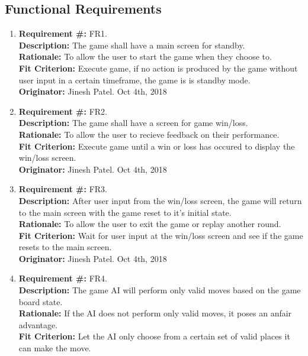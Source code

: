 \documentclass[12pt, titlepage]{article}
\renewcommand{\bf}{\textbf}
\begin{document}
\subsection{Functional Requirements}

\begin{enumerate}
	\item \bf{Requirement \#:} FR1.\\
	      \bf{Description:} The game shall have a main screen for standby.\\
	      \bf{Rationale:} To allow the user to start the game when they choose to.\\
	      \bf{Fit Criterion:} Execute game, if no action is produced by the game without user input in a certain timeframe, the game is is standby mode.\\
	      \bf{Originator:} Jinesh Patel. Oct 4th, 2018
	\item \bf{Requirement \#:} FR2.\\
	      \bf{Description:} The game shall have a screen for game win/loss.\\
	      \bf{Rationale:} To allow the user to recieve feedback on their performance.\\
	      \bf{Fit Criterion:} Execute game until a win or loss has occured to display the win/loss screen.\\
	      \bf{Originator:} Jinesh Patel. Oct 4th, 2018
	\item \bf{Requirement \#:} FR3.\\
	      \bf{Description:} After user input from the win/loss screen, the game will return to the main screen with the game reset to it's initial state.\\
	      \bf{Rationale:} To allow the user to exit the game or replay another round.\\
	      \bf{Fit Criterion:} Wait for user input at the win/loss screen and see if the game resets to the main screen.\\
	      \bf{Originator:} Jinesh Patel. Oct 4th, 2018
	\item \bf{Requirement \#:} FR4.\\
	      \bf{Description:} The game AI will perform only valid moves based on the game board state.\\
	      \bf{Rationale:} If the AI does not perform only valid moves, it poses an anfair advantage.\\
	      \bf{Fit Criterion:} Let the AI only choose from a certain set of valid places it can make the move.\\

\end{enumerate}
\end{document}
